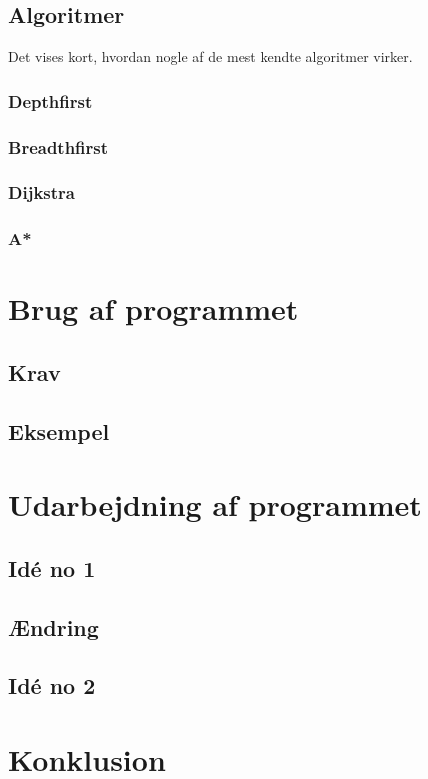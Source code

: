 \documentclass[a4paper, 12pt]{article}
\begin{document}
\subsection{Algoritmer}
Det vises kort, hvordan nogle af de mest kendte algoritmer virker.
\subsubsection{Depthfirst}
\subsubsection{Breadthfirst}
\subsubsection{Dijkstra}
\subsubsection{A*}



\newpage
\section{Brug af programmet}
\subsection{Krav}
\subsection{Eksempel}


\newpage
\section{Udarbejdning af programmet}

\subsection{Idé no 1}
\subsection{Ændring}
\subsection{Idé no 2}

\newpage
\section{Konklusion}




\newpage
\begin{appendices}
\end{appendices}
\end{document}
